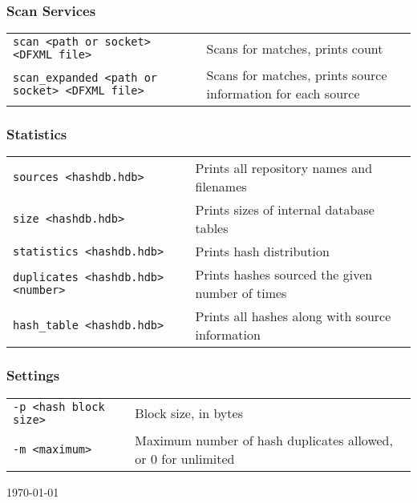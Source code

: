 \documentclass[12pt]{article}
\begin{document}
\subsubsection*{Scan Services}
\begin{tabular}{p{8 cm} p{9 cm} }
\texttt{scan <path or socket> <DFXML file>} & Scans for matches, prints count\\
\texttt{scan\_expanded <path or socket> <DFXML file>} & Scans for matches, prints source information for each source \\
\end{tabular}

\subsubsection*{Statistics}
\begin{tabular}{p{8 cm} p{9 cm} }
\texttt{sources <hashdb.hdb>} & Prints all repository names and filenames \\
\texttt{size <hashdb.hdb>} & Prints sizes of internal database tables \\
\texttt{statistics <hashdb.hdb>} & Prints hash distribution \\
\texttt{duplicates <hashdb.hdb> <number>} & Prints hashes sourced the given number of times \\
\texttt{hash\_table <hashdb.hdb>} & Prints all hashes along with source information\\
\end{tabular}

\subsubsection*{Settings}
\begin{tabular}{p{8 cm} p{9 cm} }
\texttt{-p <hash block size>} & Block size, in bytes \\
\texttt{-m <maximum>} & Maximum number of hash duplicates allowed, or 0 for unlimited\\
\end{tabular}

\vspace{10mm}
\begin{center}
\begin{footnotesize}
\today
\end{footnotesize}
\end{center}
\end{document}
